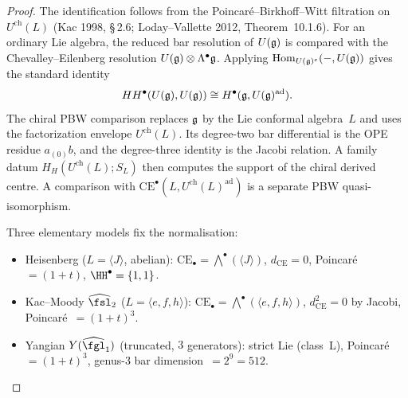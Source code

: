 \begin{proof}
The identification follows from the Poincar\'e--Birkhoff--Witt
filtration on $U^{\mathrm{ch}}(L)$ (Kac 1998, \S\,2.6;
Loday--Vallette 2012, Theorem~10.1.6).  For an ordinary Lie algebra,
the reduced bar resolution of $U(\frak g)$ is compared with the
Chevalley--Eilenberg resolution
$U(\frak g)\otimes\Lambda^\bullet\frak g$.  Applying
$\operatorname{Hom}_{U(\frak g)^e}(-,U(\frak g))$ gives the standard
identity
\[
 HH^\bullet(U(\frak g),U(\frak g))
 \cong H^\bullet(\frak g,U(\frak g)^{\mathrm{ad}}).
\]
The chiral PBW comparison replaces $\frak g$ by the Lie conformal
algebra~$L$ and uses the factorization envelope
$U^{\mathrm{ch}}(L)$.  Its degree-two bar differential is the OPE
residue $a_{(0)}b$, and the degree-three identity is the Jacobi
relation.  A family datum $H_H(U^{\mathrm{ch}}(L);S_L)$ then computes
the support of the chiral derived centre.  A comparison with
$\mathrm{CE}^\bullet(L,U^{\mathrm{ch}}(L)^{\mathrm{ad}})$ is a
separate PBW quasi-isomorphism.

Three elementary models fix the normalisation:
\begin{itemize}
 \item Heisenberg ($L = \langle J \rangle$, abelian): $\mathrm{CE}_\bullet = \bigwedge^\bullet(\langle J \rangle)$, $d_{\mathrm{CE}} = 0$, Poincar\'e~$= (1+t)$, $\HH^\bullet = \{1, 1\}$.
 \item Kac--Moody $\widehat{\fsl}_2$ ($L = \langle e, f, h \rangle$): $\mathrm{CE}_\bullet = \bigwedge^\bullet(\langle e, f, h \rangle)$, $d_{\mathrm{CE}}^2 = 0$ by Jacobi, Poincar\'e~$= (1+t)^3$.
 \item Yangian $Y(\widehat{\fgl}_1)$ (truncated, $3$ generators): strict Lie (class~L), Poincar\'e~$= (1+t)^3$, genus-$3$ bar dimension~$= 2^9 = 512$.
\end{itemize}
\end{proof}

